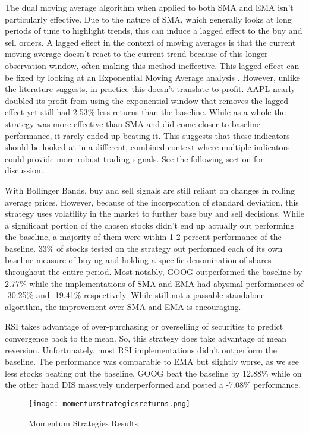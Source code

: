 \documentclass[../thesis.tex]{subfiles}
\begin{document}
The dual moving average algorithm when applied to both SMA and EMA isn't particularly effective. Due to the nature of SMA, which generally looks at long periods of time to highlight trends, this can induce a lagged effect to the buy and sell orders. A lagged effect in the context of moving averages is that the current moving average doesn't react to the current trend because of this longer observation window, often making this method ineffective. This lagged effect can be fixed by looking at an Exponential Moving Average analysis \cite{Ehlers}. However, unlike the literature suggests, in practice this doesn't translate to profit. AAPL nearly doubled its profit from using the exponential window that removes the lagged effect yet still had 2.53\% less returns than the baseline. While as a whole the strategy was more effective than SMA and did come closer to baseline performance, it rarely ended up beating it. This suggests that these indicators should be looked at in a different, combined context where multiple indicators could provide more robust trading signals. See the following section for discussion. 

With Bollinger Bands, buy and sell signals are still reliant on changes in rolling average prices. However, because of the incorporation of standard deviation, this strategy uses volatility in the market to further base buy and sell decisions. While a significant portion of the chosen stocks didn't end up actually out performing the baseline, a majority of them were within 1-2 percent performance of the baseline. 33\% of stocks tested on the strategy out performed each of its own baseline measure of buying and holding a specific denomination of shares throughout the entire period. Most notably, GOOG outperformed the baseline by 2.77\% while the implementations of SMA and EMA had abysmal performances of -30.25\% and -19.41\% respectively. While still not a passable standalone algorithm, the improvement over SMA and EMA is encouraging.

RSI takes advantage of over-purchasing or overselling of securities to predict convergence back to the mean. So, this strategy does take advantage of mean reversion. Unfortunately, most RSI implementations didn't outperform the baseline. The performance was comparable to EMA but slightly worse, as we see less stocks beating out the baseline. GOOG beat the baseline by 12.88\% while on the other hand DIS massively underperformed and posted a -7.08\% performance. 

\begin{figure}[h]
\centering
\texttt{[image: momentumstrategiesreturns.png]}
\caption{Momentum Strategies Results  \label{overflow}}
\label{MOMENTUMfigure}
\end{figure}
\end{document}
